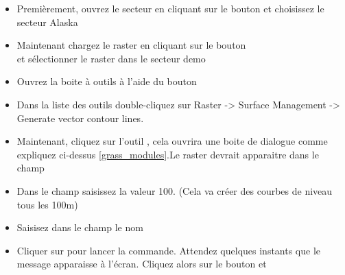 {\begin{itemize}[label=--]
\item Premièrement, ouvrez le secteur en cliquant sur le bouton  et choisissez le secteur Alaska
\item Maintenant chargez le raster en cliquant sur le bouton\\  et sélectionner le raster  dans le secteur demo
\item Ouvrez la boite à outils à l'aide du bouton 
\item Dans la liste des outils double-cliquez sur Raster -> Surface Management -> Generate vector contour lines.
\item Maintenant, cliquez sur l'outil , cela ouvrira une boite de dialogue comme expliquez ci-dessus \ref{grass_modules}.Le raster  devrait apparaitre dans le champ\\ 
\item Dans le champ  saisissez la valeur 100. (Cela va créer des courbes de niveau tous les 100m)
\item Saisisez dans le champ  le nom 
\item Cliquer sur  pour lancer la commande. Attendez quelques instants que le message  apparaisse à l'écran.
Cliquez alors sur le bouton  et 
\end{itemize}

}
